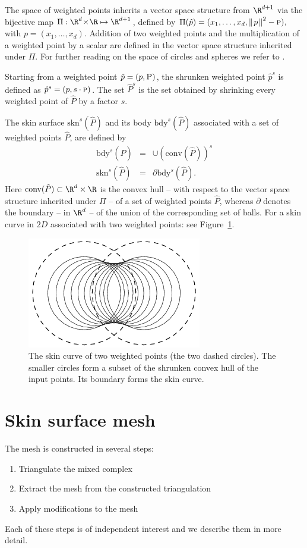 The space of weighted points inherits a vector space structure from
$\R^{d+1}$ via the bijective map $\Pi:\R^d\!\times\!\R\mapsto\R^{d+1}$,
defined by $\Pi(\hat{p}) =
(x_1,\ldots,x_d,{\parallel\! {p} \!\parallel}^2-\textsc{p}),$ with
${p}=(x_1,\ldots,x_d)$. Addition of two weighted points and
the multiplication of a weighted point by a scalar are defined in the
vector space structure inherited under $\Pi$. For further reading on
the space of circles and spheres we refer to \cite{p-gcc-70}.

Starting from a weighted point $\hat{p}=({p},\textsc{P})$, the
shrunken weighted point $\hat{p}^s$ is defined as $\hat{p}^s =
({p},s\cdot \textsc{p})$.  The set $\hat{P}^s$ is the set
obtained by shrinking every weighted point of $\hat{P}$ by a
factor $s$.

The skin surface $\mbox{skn}^{s}(\hat{P})$ and its body
$\mbox{bdy}^{s}(\hat{P})$ associated with a set of weighted points
$\hat{P}$, are defined by
\begin{eqnarray}
  \label{eq:defbody}
  \mbox{bdy}^{s}(\hat{P}) &=& \cup(\mbox{conv} (\hat{P}))^s\\
  \label{eq:defskin}
  \mbox{skn}^{s}(\hat{P}) &=& \partial{\mbox{bdy}^{s}(\hat{P})}.
\end{eqnarray}
%
Here $\mbox{conv}(\hat{P}) \subset \R^d\times\R$ is the convex hull --
with respect to the vector space structure inherited under $\Pi$ -- of
a set of weighted points $\hat{P}$, whereas $\partial$ denotes the
boundary -- in $\R^d$ -- of the union of the corresponding set of
balls. For a skin curve in $2D$ associated with two weighted points:
see Figure~\ref{fig:twoPoints}.

\begin{figure}
\centering
\includegraphics[width=.5\textwidth]{skinTwoPoints}
\caption{\label{fig:twoPoints} The skin curve of two weighted points
  (the two dashed circles). The smaller circles form a subset of the
  shrunken convex hull of the input points. Its boundary forms the skin
  curve. }
\end{figure}


\section{Skin surface mesh}
The mesh is constructed in several steps:
\begin{enumerate}
\item Triangulate the mixed complex
\item Extract the mesh from the constructed triangulation
\item Apply modifications to the mesh
\end{enumerate}
Each of these steps is of independent interest and we describe them in
more detail.

